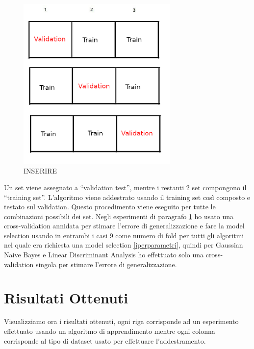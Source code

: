 \documentclass[12pt,italian]{report}
\begin{document}
\begin{figure}[h]
	\centering
	\includegraphics[width = 79mm]{immagini/cross-validation}
	\caption{INSERIRE}
\end{figure}
Un set viene assegnato a ``validation test'', mentre i restanti 2 set compongono il ``training set''. L'algoritmo viene addestrato usando il training set così composto e testato sul  validation. Questo procedimento viene eseguito per tutte le combinazioni possibili dei set.
Negli esperimenti di paragrafo \ref{sec:risultati} ho usato una cross-validation annidata per stimare l'errore di generalizzazione e fare la model selection usando in entrambi i casi 9 come numero di fold per tutti gli algoritmi nel quale era richiesta una model selection \ref{iperparametri}, quindi per Gaussian Naive Bayes e Linear Discriminant Analysis ho effettuato solo una cross-validation singola per stimare l'errore di generalizzazione.




\newpage
\section{Risultati Ottenuti}
\label{sec:risultati}
Visualizziamo ora i risultati ottenuti, ogni riga corrisponde ad un esperimento effettuato usando un algoritmo di apprendimento mentre ogni colonna corrisponde al tipo di dataset usato per effettuare l'addestramento.
\end{document}
